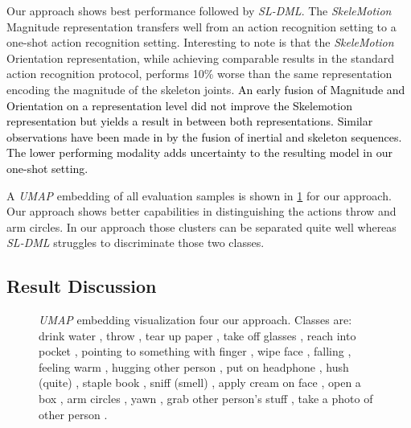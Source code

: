 Our \approachname{} approach shows best performance followed by \textit{SL-DML}. The \textit{SkeleMotion} Magnitude \cite{caetano2019skelemotion} representation transfers well from an action recognition setting to a one-shot action recognition setting. Interesting to note is that the \textit{SkeleMotion} Orientation  \cite{caetano2019skelemotion} representation, while achieving comparable results in the standard action recognition protocol, performs 10\% worse than the same representation encoding the magnitude of the skeleton joints. 
\textcolor{black}{An early fusion of Magnitude and Orientation on a representation level did not improve the Skelemotion representation but yields a result in between both representations. Similar observations have been made in \cite{memmesheimer2020signal} by the fusion of inertial and skeleton sequences. The lower performing modality adds uncertainty to the resulting model in our one-shot setting.}










A \textit{UMAP} embedding of all evaluation samples is shown in \figname \ref{fig:umap_embedding} for our \approachname{} approach. 
Our approach shows better capabilities in distinguishing the actions \textcolor{throw}{throw} and \textcolor{arm_circles}{arm circles}. In our approach those clusters can be separated quite well whereas \textit{SL-DML} struggles to discriminate those two classes.

\subsection{Result Discussion}
\label{ssec:results}



\begin{figure}
    \centering

    \caption{\textit{UMAP} embedding visualization four our approach. Classes are: drink water \textcolor{drink_water}{},
throw \textcolor{throw}{},
tear up paper \textcolor{tear_up_paper}{},
take off glasses \textcolor{take_off_glasses}{},
reach into pocket \textcolor{reach_into_pocket}{},
pointing to something with finger \textcolor{pointing_to_something_with_finger}{},
wipe face \textcolor{wipe_face}{},
falling \textcolor{falling}{},
feeling warm \textcolor{feeling_warm}{},
hugging other person \textcolor{hugging_other_person}{},
put on headphone \textcolor{put_on_headphone}{},
hush (quite) \textcolor{hush_(quite)}{},
staple book \textcolor{staple_book}{},
sniff (smell) \textcolor{sniff_(smell)}{},
apply cream on face \textcolor{apply_cream_on_face}{},
open a box \textcolor{open_a_box}{},
arm circles \textcolor{arm_circles}{},
yawn \textcolor{yawn}{},
grab other person’s stuff \textcolor{grab_other_persons_stuff}{},
take a photo of other person \textcolor{take_a_photo_of_other_person}{}.}
    \label{fig:umap_embedding}
\end{figure}

